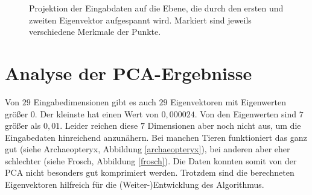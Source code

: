  \begin{figure}
  \qquad
  \qquad
  
  \caption{Projektion der Eingabdaten auf die Ebene, die durch den ersten und zweiten Eigenvektor aufgespannt wird. Markiert sind jeweils verschiedene Merkmale der Punkte.}
  \label{projections_tags}
 \end{figure}
 

 \section{Analyse der PCA-Ergebnisse}
 \label{section_pca_result_analysis}
 
 Von $29$ Eingabedimensionen gibt es auch $29$ Eigenvektoren mit Eigenwerten größer $0$. Der kleinste hat einen Wert von $0,000024$. Von den Eigenwerten sind $7$ größer als $0,01$. Leider reichen diese $7$ Dimensionen aber noch nicht aus, um die Eingabedaten hinreichend anzunähern. Bei manchen Tieren funktioniert das ganz gut (siehe Archaeopteryx, Abbildung \ref{archaeopteryx}), bei anderen aber eher schlechter (siehe Frosch, Abbildung \ref{frosch}).
 Die Daten konnten somit von der PCA nicht besonders gut komprimiert werden. Trotzdem sind die berechneten Eigenvektoren hilfreich für die (Weiter-)Entwicklung des Algorithmus. 
 
